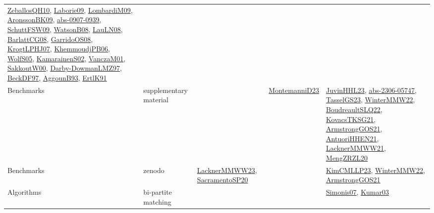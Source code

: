 {\begin{longtable}{lp{3cm}>{\raggedright}p{6cm}>{\raggedright}p{6cm}p{8cm}}
\href{articles/ZeballosQH10.pdf}{ZeballosQH10}\cite{ZeballosQH10}, \href{papers/Laborie09.pdf}{Laborie09}\cite{Laborie09}, \href{papers/LombardiM09.pdf}{LombardiM09}\cite{LombardiM09}, \href{papers/AronssonBK09.pdf}{AronssonBK09}\cite{AronssonBK09}, \href{articles/abs-0907-0939.pdf}{abs-0907-0939}\cite{abs-0907-0939}, \href{papers/SchuttFSW09.pdf}{SchuttFSW09}\cite{SchuttFSW09}, \href{papers/WatsonB08.pdf}{WatsonB08}\cite{WatsonB08}, \href{papers/LauLN08.pdf}{LauLN08}\cite{LauLN08}, \href{papers/BarlattCG08.pdf}{BarlattCG08}\cite{BarlattCG08}, \href{articles/GarridoOS08.pdf}{GarridoOS08}\cite{GarridoOS08}, \href{papers/KrogtLPHJ07.pdf}{KrogtLPHJ07}\cite{KrogtLPHJ07}, \href{papers/KhemmoudjPB06.pdf}{KhemmoudjPB06}\cite{KhemmoudjPB06}, \href{papers/WolfS05.pdf}{WolfS05}\cite{WolfS05}, \href{papers/KamarainenS02.pdf}{KamarainenS02}\cite{KamarainenS02}, \href{papers/VanczaM01.pdf}{VanczaM01}\cite{VanczaM01}, \href{articles/SakkoutW00.pdf}{SakkoutW00}\cite{SakkoutW00}, \href{articles/Darby-DowmanLMZ97.pdf}{Darby-DowmanLMZ97}\cite{Darby-DowmanLMZ97}, \href{papers/BeckDF97.pdf}{BeckDF97}\cite{BeckDF97}, \href{articles/AggounB93.pdf}{AggounB93}\cite{AggounB93}, \href{papers/ErtlK91.pdf}{ErtlK91}\cite{ErtlK91}\\
Benchmarks & supplementary material &  & \href{articles/MontemanniD23.pdf}{MontemanniD23}\cite{MontemanniD23} & \href{papers/JuvinHHL23.pdf}{JuvinHHL23}\cite{JuvinHHL23}, \href{articles/abs-2306-05747.pdf}{abs-2306-05747}\cite{abs-2306-05747}, \href{papers/TasselGS23.pdf}{TasselGS23}\cite{TasselGS23}, \href{papers/WinterMMW22.pdf}{WinterMMW22}\cite{WinterMMW22}, \href{papers/BoudreaultSLQ22.pdf}{BoudreaultSLQ22}\cite{BoudreaultSLQ22}, \href{papers/KovacsTKSG21.pdf}{KovacsTKSG21}\cite{KovacsTKSG21}, \href{papers/ArmstrongGOS21.pdf}{ArmstrongGOS21}\cite{ArmstrongGOS21}, \href{papers/AntuoriHHEN21.pdf}{AntuoriHHEN21}\cite{AntuoriHHEN21}, \href{papers/LacknerMMWW21.pdf}{LacknerMMWW21}\cite{LacknerMMWW21}, \href{articles/MengZRZL20.pdf}{MengZRZL20}\cite{MengZRZL20}\\
Benchmarks & zenodo & \href{articles/LacknerMMWW23.pdf}{LacknerMMWW23}\cite{LacknerMMWW23}, \href{articles/SacramentoSP20.pdf}{SacramentoSP20}\cite{SacramentoSP20} &  & \href{papers/KimCMLLP23.pdf}{KimCMLLP23}\cite{KimCMLLP23}, \href{papers/WinterMMW22.pdf}{WinterMMW22}\cite{WinterMMW22}, \href{papers/ArmstrongGOS21.pdf}{ArmstrongGOS21}\cite{ArmstrongGOS21}\\
Algorithms & bi-partite matching &  &  & \href{articles/Simonis07.pdf}{Simonis07}\cite{Simonis07}, \href{papers/Kumar03.pdf}{Kumar03}\cite{Kumar03}\\

\end{longtable}}
